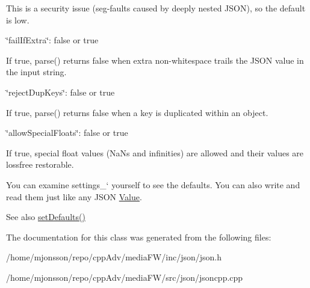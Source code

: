 \begin{DoxyItemize}
\begin{DoxyItemize}
\item This is a security issue (seg-\/faults caused by deeply nested J\+S\+ON), so the default is low.
\end{DoxyItemize}
\item {\ttfamily \char`\"{}fail\+If\+Extra\char`\"{}\+: false or true}
\begin{DoxyItemize}
\item If true, {\ttfamily parse()} returns false when extra non-\/whitespace trails the J\+S\+ON value in the input string.
\end{DoxyItemize}
\item {\ttfamily \char`\"{}reject\+Dup\+Keys\char`\"{}\+: false or true}
\begin{DoxyItemize}
\item If true, {\ttfamily parse()} returns false when a key is duplicated within an object.
\end{DoxyItemize}
\item {\ttfamily \char`\"{}allow\+Special\+Floats\char`\"{}\+: false or true}
\begin{DoxyItemize}
\item If true, special float values (Na\+Ns and infinities) are allowed and their values are lossfree restorable.
\end{DoxyItemize}
\end{DoxyItemize}

You can examine \textquotesingle{}settings\+\_\+` yourself to see the defaults. You can also write and read them just like any J\+S\+ON \hyperlink{classJson_1_1Value}{Value}. \begin{DoxySeeAlso}{See also}
\hyperlink{classJson_1_1CharReaderBuilder_a03ff031e06aabff989ab4addc87294ab}{set\+Defaults()} 
\end{DoxySeeAlso}


The documentation for this class was generated from the following files\+:\begin{DoxyCompactItemize}
\item 
/home/mjonsson/repo/cpp\+Adv/media\+F\+W/inc/json/json.\+h\item 
/home/mjonsson/repo/cpp\+Adv/media\+F\+W/src/json/jsoncpp.\+cpp\end{DoxyCompactItemize}
